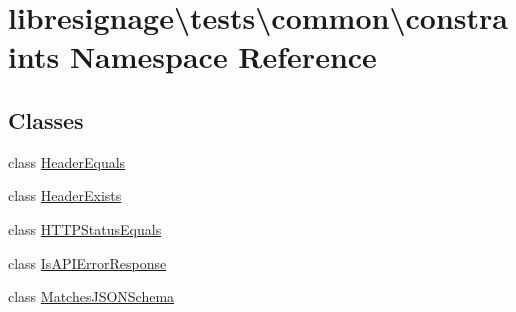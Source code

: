 \hypertarget{namespacelibresignage_1_1tests_1_1common_1_1constraints}{}\section{libresignage\textbackslash{}tests\textbackslash{}common\textbackslash{}constraints Namespace Reference}
\label{namespacelibresignage_1_1tests_1_1common_1_1constraints}
\subsection*{Classes}
\begin{DoxyCompactItemize}
\item 
class \hyperlink{classlibresignage_1_1tests_1_1common_1_1constraints_1_1HeaderEquals}{Header\+Equals}
\item 
class \hyperlink{classlibresignage_1_1tests_1_1common_1_1constraints_1_1HeaderExists}{Header\+Exists}
\item 
class \hyperlink{classlibresignage_1_1tests_1_1common_1_1constraints_1_1HTTPStatusEquals}{H\+T\+T\+P\+Status\+Equals}
\item 
class \hyperlink{classlibresignage_1_1tests_1_1common_1_1constraints_1_1IsAPIErrorResponse}{Is\+A\+P\+I\+Error\+Response}
\item 
class \hyperlink{classlibresignage_1_1tests_1_1common_1_1constraints_1_1MatchesJSONSchema}{Matches\+J\+S\+O\+N\+Schema}
\end{DoxyCompactItemize}
